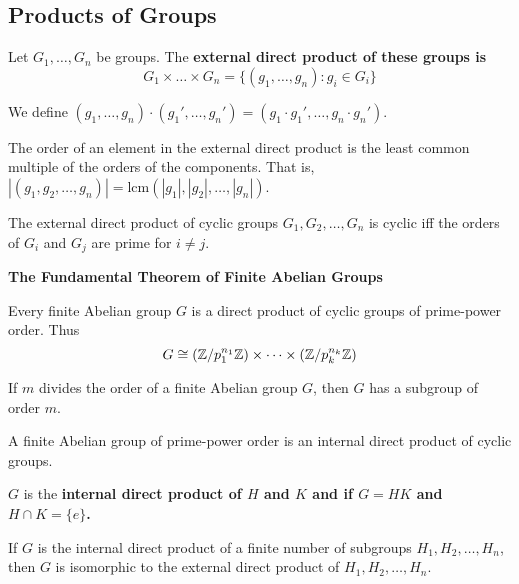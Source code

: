 \documentclass{hmwk}
\begin{document}
\subsection{Products of Groups}

\begin{defn}
Let $G_1, \dots, G_n$ be groups. The \bf{external direct product} of these groups is $$G_1 \times \dots \times G_n = \{(g_1, \dots, g_n) : g_i \in G_i\}$$

We define $(g_1, \dots, g_n) \cdot (g_1', \dots, g_n') = (g_1\cdot g_1', \dots, g_n\cdot g_n')$.
\end{defn}

\begin{prop}
The order of an element in the external direct product is the least common multiple of the orders of the components. That is, $|(g_1, g_2, \dots, g_n)| = \text{lcm}(|g_1|, |g_2|, \dots, |g_n|)$.
\end{prop}

\begin{prop}
The external direct product of cyclic groups $G_1, G_2, \dots, G_n$ is cyclic iff the orders of $G_i$ and $G_j$ are prime for $i \neq j$.
\end{prop}

\begin{important}
\bf{The Fundamental Theorem of Finite Abelian Groups}

Every finite Abelian group $G$ is a direct product of cyclic groups of prime-power order. Thus $$G \cong (\mathbb{Z}/{p_1^{n_1}}\mathbb{Z}) \times \dots \times (\mathbb{Z}/{p_k^{n_k}}\mathbb{Z})$$
\end{important}

\begin{prop}
If $m$ divides the order of a finite Abelian group $G$, then $G$ has a subgroup of order $m$.
\end{prop}

\begin{prop}
A finite Abelian group of prime-power order is an internal direct product of cyclic groups.
\end{prop}

\begin{defn}
$G$ is the \bf{internal direct product} of $H$ and $K$ and if $G = HK$ and $H \cap K = \{e\}$.
\end{defn}

\begin{prop}
If $G$ is the internal direct product of a finite number of subgroups $H_1, H_2, \dots, H_n$, then $G$ is isomorphic to the external direct product of $H_1, H_2, \dots, H_n$.
\end{prop}
\end{document}
